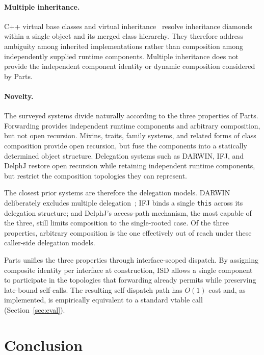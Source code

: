 \documentclass[acmsmall,screen,review,anonymous]{acmart}
\theoremstyle{acmplain}
\newcommand{\code}[1]{\texttt{#1}}
\begin{document}
\paragraph{Multiple inheritance.}
C++ virtual base classes and virtual inheritance~\cite{stroustrup1987}
resolve inheritance diamonds within a single object and its merged class
hierarchy. They therefore address ambiguity among inherited implementations
rather than composition among independently supplied runtime components.
Multiple inheritance does not provide the independent component identity or
dynamic composition considered by Parts.

\paragraph{Novelty.}
The surveyed systems divide naturally according to the three properties of
Parts. Forwarding provides independent runtime components and arbitrary
composition, but not open recursion. Mixins, traits, family systems, and
related forms of class composition provide open recursion, but fuse the
components into a statically determined object structure. Delegation systems
such as DARWIN, IFJ, and DelphJ restore open recursion while retaining
independent runtime components, but restrict the composition topologies they
can represent.

The closest prior systems are therefore the delegation models. DARWIN
deliberately excludes multiple delegation~\cite[\S6.5.1]{kniesel2000}; IFJ
binds a single \code{this} across its delegation structure; and DelphJ's
access-path mechanism, the most capable of the three, still limits composition
to the single-rooted case. Of the three properties, arbitrary composition is
the one effectively out of reach under these caller-side delegation models.

Parts unifies the three properties through interface-scoped dispatch. By assigning composite identity per interface at construction,
ISD allows a single component to participate in the topologies that forwarding already permits while preserving late-bound
self-calls. The resulting self-dispatch path has $O(1)$ cost and, as implemented, is empirically equivalent to a standard
vtable call (Section~\ref{sec:eval}).

\section{Conclusion}
\end{document}
